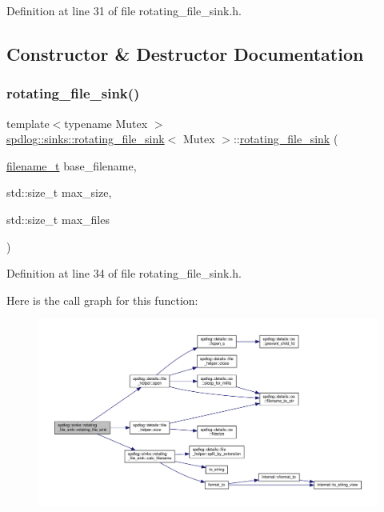 Definition at line 31 of file rotating\+\_\+file\+\_\+sink.\+h.



\subsection{Constructor \& Destructor Documentation}
\mbox{\label{classspdlog_1_1sinks_1_1rotating__file__sink_a0e754181168b32e8b1b60b82c35179e8}} 
\subsubsection{\texorpdfstring{rotating\+\_\+file\+\_\+sink()}{rotating\_file\_sink()}}
{\footnotesize\ttfamily template$<$typename Mutex $>$ \\
\hyperlink{classspdlog_1_1sinks_1_1rotating__file__sink}{spdlog\+::sinks\+::rotating\+\_\+file\+\_\+sink}$<$ Mutex $>$\+::\hyperlink{classspdlog_1_1sinks_1_1rotating__file__sink}{rotating\+\_\+file\+\_\+sink} (\begin{DoxyParamCaption}\item[{\hyperlink{namespacespdlog_acf7ce125b3622e44f8f1702d699e0b06}{filename\+\_\+t}}]{base\+\_\+filename,  }\item[{std\+::size\+\_\+t}]{max\+\_\+size,  }\item[{std\+::size\+\_\+t}]{max\+\_\+files }\end{DoxyParamCaption})\hspace{0.3cm}{\ttfamily [inline]}}



Definition at line 34 of file rotating\+\_\+file\+\_\+sink.\+h.

Here is the call graph for this function\+:
\nopagebreak
\begin{figure}[H]
\begin{center}
\leavevmode
\includegraphics[width=350pt]{classspdlog_1_1sinks_1_1rotating__file__sink_a0e754181168b32e8b1b60b82c35179e8_cgraph}
\end{center}
\end{figure}


